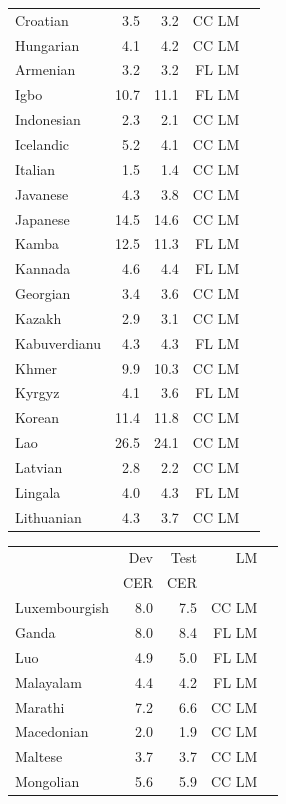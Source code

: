 {\begin{table}[h!]
\begin{small}
\begin{minipage}[t]{0.49\textwidth}
\begin{tabular}{lrrrr}
Croatian & 3.5 & 3.2 & CC LM \\
Hungarian & 4.1 & 4.2 & CC LM \\
Armenian & 3.2 & 3.2 & FL LM \\
Igbo & 10.7 & 11.1 & FL LM \\
Indonesian & 2.3 & 2.1 & CC LM \\
Icelandic & 5.2 & 4.1 & CC LM \\
Italian & 1.5 & 1.4 & CC LM \\
Javanese & 4.3 & 3.8 & CC LM \\
Japanese & 14.5 & 14.6 & CC LM \\
Kamba & 12.5 & 11.3 & FL LM \\
Kannada & 4.6 & 4.4 & FL LM \\
Georgian & 3.4 & 3.6 & CC LM \\
Kazakh & 2.9 & 3.1 & CC LM \\
Kabuverdianu & 4.3 & 4.3 & FL LM \\
Khmer & 9.9 & 10.3 & CC LM \\
Kyrgyz & 4.1 & 3.6 & FL LM \\
Korean & 11.4 & 11.8 & CC LM \\
Lao & 26.5 & 24.1 & CC LM \\
Latvian & 2.8 & 2.2 & CC LM \\
Lingala & 4.0 & 4.3 & FL LM \\
Lithuanian & 4.3 & 3.7 & CC LM \\
\bottomrule
\end{tabular}
\end{minipage} \hfill
\begin{minipage}[t]{0.49\textwidth}
\begin{tabular}{lrrrr}
\toprule
& Dev  &  Test   & LM    \\
& CER  &  CER   &     \\
\midrule
Luxembourgish & 8.0 & 7.5 & CC LM \\
Ganda & 8.0 & 8.4 & FL LM \\
Luo & 4.9 & 5.0 & FL LM \\
Malayalam & 4.4 & 4.2 & FL LM \\
Marathi & 7.2 & 6.6 & CC LM \\
Macedonian & 2.0 & 1.9 & CC LM \\
Maltese & 3.7 & 3.7 & CC LM \\
Mongolian & 5.6 & 5.9 & CC LM \\

\end{tabular}
\end{minipage}
\end{small}
\end{table}}
